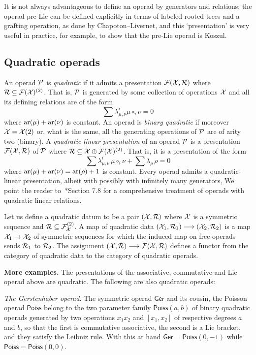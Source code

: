 \begin{note} It is not always advantageous
to define an operad by generators and relations:
the operad pre-Lie can be defined explicitly
in terms of labeled rooted trees and a grafting
operation, as done by Chapoton--Livernet, and
this `presentation' is very useful in practice,
for example, to show that the pre-Lie operad
is Koszul.
\end{note}

\subsection{Quadratic operads}
An operad ${\mathcal{P}}$ is \emph{quadratic} if it admits a presentation
$\mathcal{F}(\mathcal{X},\mathcal{R})$ where $\mathcal{R} \subseteq \mathcal{F}(\mathcal{X})^{(2)}$. 
That is, ${\mathcal{P}}$ is generated by some collection of
operations $\mathcal{X}$ and all its defining relations are of the form
\[ \sum \lambda_{\mu,\nu}^i \mu \circ_i \nu = 0  \] 
where $\operatorname{ar}(\mu)+\operatorname{ar}(\nu)$ is constant. An operad is
\emph{binary quadratic} if moreover $\mathcal{X} = \mathcal{X}(2)$ or,
what is the same, all the generating operations of ${\mathcal{P}}$
are of arity two (binary). 
 A \emph{quadratic-linear presentation} of an operad ${\mathcal{P}}$
is a presentation $\mathcal{F}(\mathcal{X},\mathcal{R})$ of ${\mathcal{P}}$ where $\mathcal{R} 
\subseteq \mathcal{X} \oplus \mathcal{F}(\mathcal{X})^{(2)}$. That is, it is
a presentation of the form
\[ \sum \lambda_{\mu,\nu}^i \,\mu \circ_i \nu 
 + \sum \lambda_\rho \,\rho = 0   \] 
 where $\operatorname{ar}(\mu)+\operatorname{ar}(\nu) = \operatorname{ar}(\rho)+1$ is constant.
 Every operad admits a quadratic-linear
presentation, albeit with possibly with infinitely many generators, 
We point the reader to~\cite{Loday2012}*{Section 7.8} for a comprehensive treatment of operads
with quadratic linear relations.
 
 Let us define a quadratic datum to be a pair $(\mathcal{X},\mathcal{R})$
 where $\mathcal{X}$ is a symmetric sequence and $\mathcal{R}\subseteq
 \mathcal{F}_{\mathcal{X}}^{(2)}$. A map of quadratic data $(\mathcal{X}_1,\mathcal{R}_1) 
 \longrightarrow (\mathcal{X}_2,\mathcal{R}_2)$ is a map $\mathcal{X}_1
 \to \mathcal{X}_2$ of symmetric sequences for which the induced
 map on free operads sends $\mathcal{R}_1$ to $\mathcal{R}_2$. The 
 assignment $(\mathcal{X},\mathcal{R}) \longrightarrow \mathcal{F}(\mathcal{X},\mathcal{R})$
 defines a functor from the category of quadratic data
 to the category of quadratic operads.
 
 \bigskip
 
\textbf{More examples.} The presentations of the 
associative, commutative and Lie operad above are
quadratic. The following are also quadratic operads:

\emph{The Gerstenhaber operad}. The symmetric operad
$\mathsf{Ger}$ and its cousin,
the Poisson operad $\mathsf{Poiss}$ belong to the two parameter
family $\mathsf{Poiss}(a,b)$ of binary quadratic operads generated
by two operations $x_1x_2$ and $[x_1,x_2]$ of respective degrees
$a$ and $b$, so that
the first is commutative associative, the second is a Lie
bracket, and they satisfy the Leibniz rule. With this
at hand $\mathsf{Ger} =\mathsf{Poiss}(0,-1)$ while  
$\mathsf{Poiss} = \mathsf{Poiss}(0,0)$.

